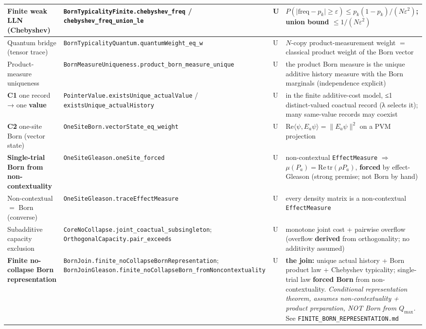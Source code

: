 \documentclass[11pt,a4paper]{article}
\begin{document}
\begin{center}
\begin{tabularx}{\linewidth}{|Y|Y|Y|Y|}
\hline
Finite weak LLN (Chebyshev) & \texttt{BornTypicalityFinite.chebyshev\_freq} / \texttt{chebyshev\_freq\_union\_le} & U & $P(\lvert\mathrm{freq}-p_k\rvert\ge\varepsilon)\le p_k(1-p_k)/(N\varepsilon^2)$; union bound $\le 1/(N\varepsilon^2)$ \\
\hline
Quantum bridge (tensor trace) & \texttt{BornTypicalityQuantum.quantumWeight\_eq\_w} & U & $N$-copy product-measurement weight $=$ classical product weight of the Born vector \\
\hline
Product-measure uniqueness & \texttt{BornMeasureUniqueness.product\_born\_measure\_unique} & U & the product Born measure is the unique additive history measure with the Born marginals (independence explicit) \\
\hline
\textbf{C1} one record → one \textbf{value} & \texttt{PointerValue.existsUnique\_actualValue} / \texttt{existsUnique\_actualHistory} & U & in the finite additive-cost model, ≤1 distinct-valued coactual record (λ selects it); many same-value records may coexist \\
\hline
\textbf{C2} one-site Born (vector state) & \texttt{OneSiteBorn.vectorState\_eq\_weight} & U & $\mathrm{Re}\langle\psi,E_a\psi\rangle=\lVert E_a\psi\rVert^2$ on a PVM projection \\
\hline
\textbf{Single-trial Born from non-contextuality} & \texttt{OneSiteGleason.oneSite\_forced} & U & non-contextual \texttt{EffectMeasure} $\Rightarrow$ $\mu(P_a)=\mathrm{Re}\,\mathrm{tr}(\rho P_a)$, \textbf{forced} by effect-Gleason (strong premise; not Born by hand) \\
\hline
Non-contextual $=$ Born (converse) & \texttt{OneSiteGleason.traceEffectMeasure} & U & every density matrix is a non-contextual \texttt{EffectMeasure} \\
\hline
Subadditive capacity exclusion & \texttt{CoreNoCollapse.joint\_coactual\_subsingleton}; \texttt{OrthogonalCapacity.pair\_exceeds} & U & monotone joint cost + pairwise overflow (overflow \textbf{derived} from orthogonality; no additivity assumed) \\
\hline
\textbf{Finite no-collapse Born representation} & \texttt{BornJoin.finite\_noCollapseBornRepresentation}; \texttt{BornJoinGleason.finite\_noCollapseBorn\_fromNoncontextuality} & U & \textbf{the join:} unique actual history + Born product law + Chebyshev typicality; single-trial law \textbf{forced Born} from non-contextuality. \emph{Conditional representation theorem, assumes non-contextuality + product preparation, NOT Born from $Q_{\max}$.} See \texttt{FINITE\_BORN\_REPRESENTATION.md} \\

\end{tabularx}
\end{center}
\end{document}
